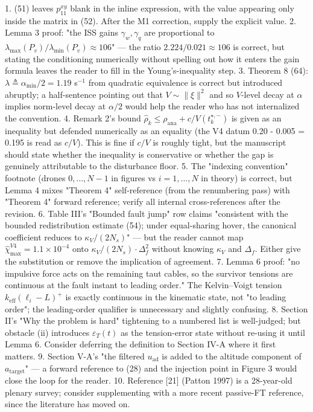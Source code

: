 1. (51) leaves $p_{11}^{xy}$ blank in the inline expression, with the value appearing only inside the matrix in (52). After the M1 correction, supply the explicit value.
2. Lemma 3 proof: "the ISS gains $\gamma_w, \gamma_q$ are proportional to $\lambda_{\max}(P_v)/\lambda_{\min}(P_v) \approx 106$" — the ratio $2.224/0.021 \approx 106$ is correct, but stating the conditioning numerically without spelling out how it enters the gain formula leaves the reader to fill in the Young's-inequality step.
3. Theorem 8 (64): $\lambda \triangleq \alpha_{\min}/2 = 1.19$ s$^{-1}$ from quadratic equivalence is correct but introduced abruptly; a half-sentence pointing out that $V \sim \|\xi\|^2$ and so $V$-level decay at $\alpha$ implies norm-level decay at $\alpha/2$ would help the reader who has not internalized the convention.
4. Remark 2's bound $\hat\rho_k \le \rho_{\mathrm{ana}} + c/V(t_k^{\star,-})$ is given as an inequality but defended numerically as an equality (the V4 datum 0.20 - 0.005 = 0.195 is read as $c/V$). This is fine if $c/V$ is roughly tight, but the manuscript should state whether the inequality is conservative or whether the gap is genuinely attributable to the disturbance floor.
5. The "indexing convention" footnote (drones $0,\ldots,N-1$ in figures vs $i=1,\ldots,N$ in theory) is correct, but Lemma 4 mixes "Theorem 4" self-reference (from the renumbering pass) with "Theorem 4" forward reference; verify all internal cross-references after the revision.
6. Table III's "Bounded fault jump" row claims "consistent with the bounded redistribution estimate (54); under equal-sharing hover, the canonical coefficient reduces to $\kappa_V/(2N_s)$" — but the reader cannot map $\hat\chi_{\max}^{V4} = 1.1\times 10^{-4}$ onto $\kappa_V/(2 N_s) \cdot \Delta_f^2$ without knowing $\kappa_V$ and $\Delta_f$. Either give the substitution or remove the implication of agreement.
7. Lemma 6 proof: "no impulsive force acts on the remaining taut cables, so the survivor tensions are continuous at the fault instant to leading order." The Kelvin–Voigt tension $k_{\mathrm{eff}}(\ell_i - L)^+$ is exactly continuous in the kinematic state, not "to leading order"; the leading-order qualifier is unnecessary and slightly confusing.
8. Section II's "Why the problem is hard" tightening to a numbered list is well-judged; but obstacle (ii) introduces $\varepsilon_T(t)$ as the tension-error state without re-using it until Lemma 6. Consider deferring the definition to Section IV-A where it first matters.
9. Section V-A's "the filtered $u_{\mathrm{ad}}$ is added to the altitude component of $a_{\mathrm{target}}$" — a forward reference to (28) and the injection point in Figure 3 would close the loop for the reader.
10. Reference [21] (Patton 1997) is a 28-year-old plenary survey; consider supplementing with a more recent passive-FT reference, since the literature has moved on.

